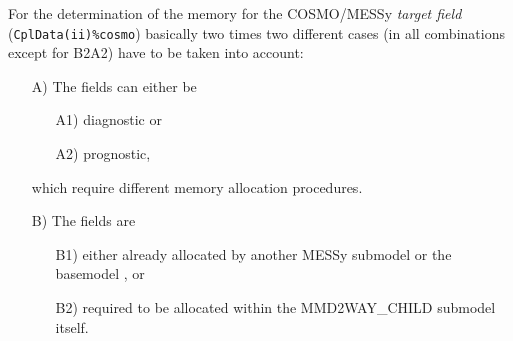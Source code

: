 \documentclass[11pt,twoside]{article}
\begin{document}
\begin{itemize}
\begin{enumerate}
For the determination of the memory for the COSMO/MESSy {\it target field} 
(\verb|CplData(ii)%cosmo|) basically two times two different cases (in all
combinations except for B2A2) have to be taken into account:
\begin{itemize} %
 \item[A)] The fields can either be 
\begin{itemize}%
\item[A1)] diagnostic or
\item[A2)] prognostic,
\end{itemize}%
which require different memory allocation procedures.
\item[B)] The fields  are
\begin{itemize}%
\item[B1)] either already allocated by another MESSy submodel or the basemodel
, or
\item[B2)] required to be allocated within the MMD2WAY\_CHILD submodel itself.
\end{itemize}%
\end{itemize} %



\end{enumerate}
\end{itemize}
\end{document}

